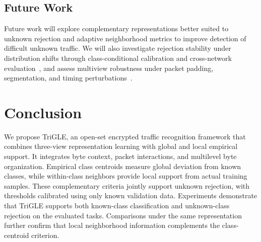 \subsection{Future Work}
Future work will explore complementary representations better suited to unknown rejection and adaptive neighborhood metrics to improve detection of difficult unknown traffic. We will also investigate rejection stability under distribution shifts through class-conditional calibration and cross-network evaluation~, and assess multiview robustness under packet padding, segmentation, and timing perturbations~.

\section{Conclusion}\label{sec:conclusion}
We propose TriGLE, an open-set encrypted traffic recognition framework that combines three-view representation learning with global and local empirical support. It integrates byte context, packet interactions, and multilevel byte organization. Empirical class centroids measure global deviation from known classes, while within-class neighbors provide local support from actual training samples. These complementary criteria jointly support unknown rejection, with thresholds calibrated using only known validation data. Experiments demonstrate that TriGLE supports both known-class classification and unknown-class rejection on the evaluated tasks. Comparisons under the same representation further confirm that local neighborhood information complements the class-centroid criterion.
